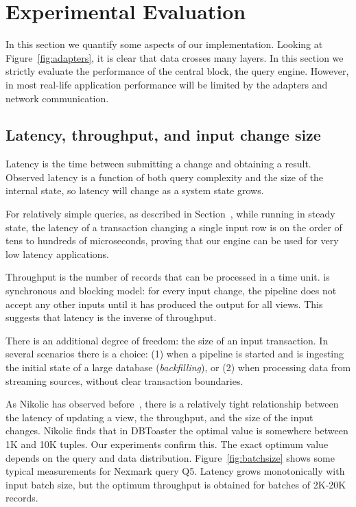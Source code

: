 \section{Experimental Evaluation}\label{sec:experiments}

In this section we quantify some aspects of our implementation.
Looking at Figure~\ref{fig:adapters}, it is clear that data crosses
many layers.  In this section we strictly evaluate the performance of
the central block, the \dbsp query engine.  However, in most real-life
application performance will be limited by the adapters and network
communication.

\subsection{Latency, throughput, and input change size}

Latency is the time between submitting a change and obtaining a
result.  Observed latency is a function of both query complexity and
the size of the internal state, so latency will change as a system
state grows.

For relatively simple queries, as described in
Section~, while running in steady state,
the latency of a transaction changing a single input row is on the
order of tens to hundreds of microseconds, proving that our engine can
be used for very low latency applications.

Throughput is the number of records that can be processed in a time
unit.  \dbsp is synchronous and blocking model: for every input
change, the pipeline does not accept any other inputs until it has
produced the output for all views.  This suggests that latency is the
inverse of throughput.

There is an additional degree of freedom: the size of an input
transaction.  In several scenarios there is a choice: (1) when a
pipeline is started and is ingesting the initial state of a large
database (\emph{backfilling}), or (2) when processing data from
streaming sources, without clear transaction boundaries.

As Nikolic has observed before~\cite{nikolic-sigmod16}, there is a
relatively tight relationship between the latency of updating a view,
the throughput, and the size of the input changes.  Nikolic finds that
in DBToaster the optimal value is somewhere between 1K and 10K tuples.
Our experiments confirm this.  The exact optimum value depends on the
query and data distribution.  Figure~\ref{fig:batchsize} shows some
typical measurements for Nexmark query Q5.  Latency grows
monotonically with input batch size, but the optimum throughput is
obtained for batches of 2K-20K records.

